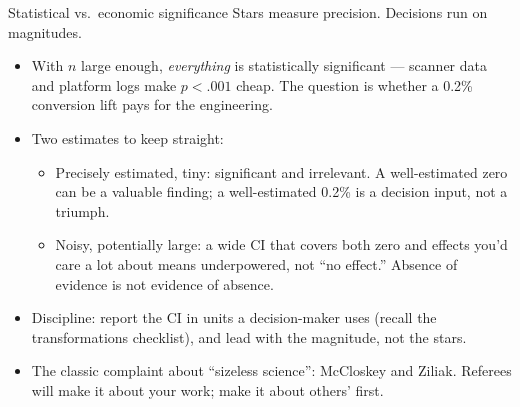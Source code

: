 \documentclass[aspectratio=169,11pt]{beamer}
\begin{document}
\begin{frame}{Statistical vs.\ economic significance}
Stars measure \alert{precision}. Decisions run on \alert{magnitudes}.
\begin{itemize}
	\item With $n$ large enough, \emph{everything} is statistically significant ---
	scanner data and platform logs make $p < .001$ cheap. The question is whether a
	0.2\% conversion lift pays for the engineering.

	\medskip
	\item Two estimates to keep straight:
	\begin{itemize}
		\item \alert{Precisely estimated, tiny}: significant and irrelevant.
		A well-estimated zero can be a valuable finding; a well-estimated 0.2\% is a
		decision input, not a triumph.
		\item \alert{Noisy, potentially large}: a wide CI that covers both zero and
		effects you'd care a lot about means \alert{underpowered}, not ``no effect.''
		Absence of evidence is not evidence of absence.
	\end{itemize}

	\medskip
	\item Discipline: report the CI \alert{in units a decision-maker uses}
	(recall the transformations checklist), and lead with the magnitude, not the
	stars.

	\medskip
	\item The classic complaint about ``sizeless science'': McCloskey and Ziliak.
	Referees will make it about your work; make it about others' first.
\end{itemize}
\end{frame}
\end{document}
